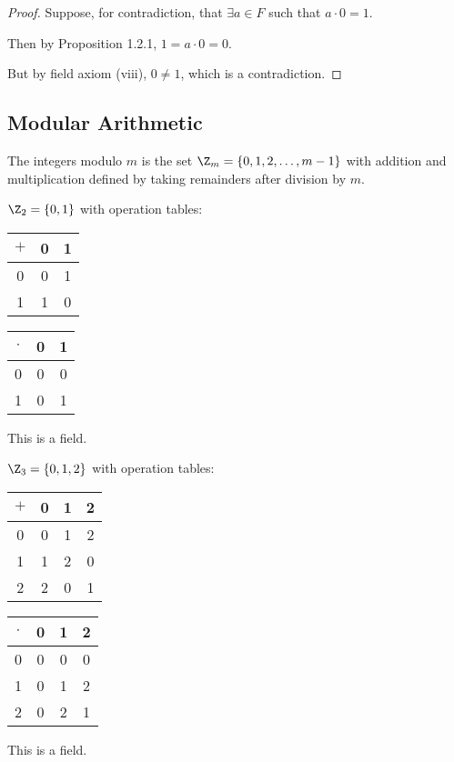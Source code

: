 \begin{proof}
    Suppose, for contradiction, that $\exists a \in F$ such that $a \cdot 0 = 1$.
    
    Then by Proposition 1.2.1, $1 = a \cdot 0 = 0$.
    
    But by field axiom (viii), $0 \neq 1$, which is a contradiction.
\end{proof}

\subsection{Modular Arithmetic}

The integers modulo $m$ is the set $\Z_m = \{0, 1, 2, \ldots, m-1\}$ with addition and multiplication defined by taking remainders after division by $m$.

\begin{eg}
    $\Z_2 = \{0, 1\}$ with operation tables:
    \begin{center}
    \begin{tabular}{c|cc} 
        $+$ & 0 & 1 \\
        \hline
        0 & 0 & 1 \\
        1 & 1 & 0
    \end{tabular}
    \qquad
    \begin{tabular}{c|cc}
        $\cdot$ & 0 & 1 \\
        \hline
        0 & 0 & 0 \\
        1 & 0 & 1
    \end{tabular}
    \end{center}
    This is a field.
\end{eg}

\begin{eg}
    $\Z_3 = \{0, 1, 2\}$ with operation tables:
    \begin{center}
    \begin{tabular}{c|ccc}
        $+$ & 0 & 1 & 2 \\
        \hline
        0 & 0 & 1 & 2 \\
        1 & 1 & 2 & 0 \\
        2 & 2 & 0 & 1
    \end{tabular}
    \qquad
    \begin{tabular}{c|ccc}
        $\cdot$ & 0 & 1 & 2 \\
        \hline
        0 & 0 & 0 & 0 \\
        1 & 0 & 1 & 2 \\
        2 & 0 & 2 & 1
    \end{tabular}
    \end{center}
    This is a field.
\end{eg}

